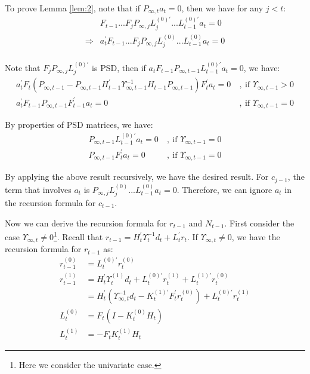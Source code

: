 \documentclass[10pt]{article}
\numberwithin{equation}{section}
\begin{document}
To prove Lemma \ref{lem:2}, note that if $P_{\infty,t}a_t=0$, then we have for any $j<t$:
\begin{align*}
    & F_{t-1}...F_jP_{\infty,j}L_{j}^{(0)'}...L_{t-1}^{(0)'}a_t=0 \\
    \Rightarrow & a_t^{'}F_{t-1}...F_jP_{\infty,j}L_{j}^{(0)}...L_{t-1}^{(0)}a_t=0 \\
\end{align*}

Note that $F_jP_{\infty,j}L_j^{(0)'}$ is PSD, then if $a_tF_{t-1}P_{\infty,t-1}L_{t-1}^{(0)'}a_t=0$, we have:
\begin{align*}
    a_t^{'}F_t(P_{\infty,t-1}-P_{\infty,t-1}H_{t-1}^{'}\Upsilon_{\infty,t-1}^{-1}H_{t-1}P_{\infty,t-1})F_t^{'}a_t=0\ &,\ \text{if } \Upsilon_{\infty,t-1}>0 \\
    a_t^{'}F_{t-1}P_{\infty,t-1}F_{t-1}^{'}a_t=0\ &,\ \text{if } \Upsilon_{\infty,t-1}=0 
\end{align*}

By properties of PSD matrices, we have:
\begin{align*}
    P_{\infty,t-1}L_{t-1}^{(0)'}a_t=0\ &,\ \text{if } \Upsilon_{\infty,t-1}=0 \\
    P_{\infty,t-1}F_t^{'}a_t=0\ &,\ \text{if } \Upsilon_{\infty,t-1}=0
\end{align*}

By applying the above result recursively, we have the desired result. For $c_{j-1}$, the term that involves $a_t$ is $P_{\infty,j}L_{j}^{(0)}...L_{t-1}^{(0)}a_t=0$. Therefore, we can ignore $a_t$ in the recursion formula for $c_{t-1}$. 

Now we can derive the recursion formula for $r_{t-1}$ and $N_{t-1}$. First consider the case $\Upsilon_{\infty,t}\neq0$\footnote{Here we consider the univariate case.}. Recall that $r_{t-1} = H_t^{'}\Upsilon_{t}^{-1}d_t + L_t^{'}r_t$. If $\Upsilon_{\infty,t}\neq0$, we have the recursion formula for $r_{t-1}$ as:
\begin{align}
    r_{t-1}^{(0)} &= L_t^{(0)'}r_t^{(0)} \label{eq:r_inf_start} \\
    r_{t-1}^{(1)} &= H_t^{'}\Upsilon_{t}^{(1)}d_t+L_t^{(0)'}r_t^{(1)} + L_t^{(1)'}r_t^{(0)} \nonumber \\
        &= H_t^{'}(\Upsilon_{\infty,t}^{-1}d_t-K_t^{(1)'}F_t^{'}r_t^{(0)}) + L_t^{(0)'}r_t^{(1)} \label{eq:r_inf_end} \\
    L_t^{(0)} &= F_t(I-K_t^{(0)}H_t) \nonumber \\
    L_t^{(1)} &= -F_tK_t^{(1)}H_t \nonumber
\end{align}
\end{document}
